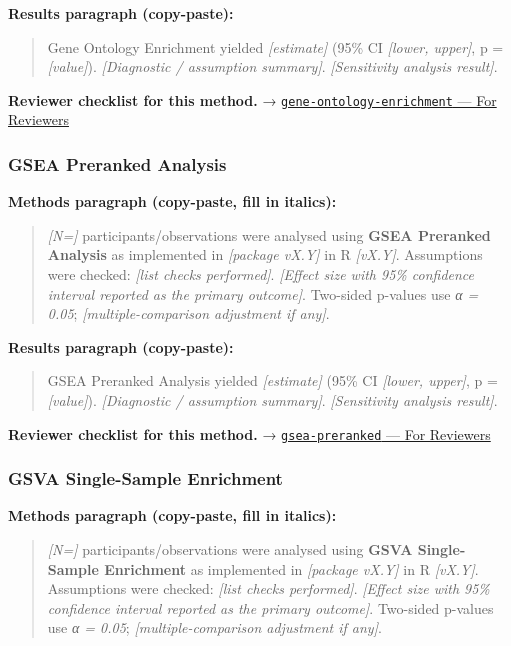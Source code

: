 \documentclass[
]{article}
\begin{document}
\textbf{Results paragraph (copy-paste):}

\begin{quote}
Gene Ontology Enrichment yielded \emph{{[}estimate{]}} (95\% CI
\emph{{[}lower, upper{]}}, p = \emph{{[}value{]}}). \emph{{[}Diagnostic
/ assumption summary{]}}. \emph{{[}Sensitivity analysis result{]}}.
\end{quote}

\textbf{Reviewer checklist for this method.} →
\href{../chapters/12-bioinformatics/gene-ontology-enrichment.Rmd\#for-reviewers}{\texttt{gene-ontology-enrichment}
--- For Reviewers}

\subsubsection{GSEA Preranked Analysis}\label{gsea-preranked-analysis}

\textbf{Methods paragraph (copy-paste, fill in italics):}

\begin{quote}
\emph{{[}N={]}} participants/observations were analysed using
\textbf{GSEA Preranked Analysis} as implemented in \emph{{[}package
vX.Y{]}} in R \emph{{[}vX.Y{]}}. Assumptions were checked: \emph{{[}list
checks performed{]}}. \emph{{[}Effect size with 95\% confidence interval
reported as the primary outcome{]}}. Two-sided p-values use \emph{α =
0.05}; \emph{{[}multiple-comparison adjustment if any{]}}.
\end{quote}

\textbf{Results paragraph (copy-paste):}

\begin{quote}
GSEA Preranked Analysis yielded \emph{{[}estimate{]}} (95\% CI
\emph{{[}lower, upper{]}}, p = \emph{{[}value{]}}). \emph{{[}Diagnostic
/ assumption summary{]}}. \emph{{[}Sensitivity analysis result{]}}.
\end{quote}

\textbf{Reviewer checklist for this method.} →
\href{../chapters/12-bioinformatics/gsea-preranked.Rmd\#for-reviewers}{\texttt{gsea-preranked}
--- For Reviewers}

\subsubsection{GSVA Single-Sample
Enrichment}\label{gsva-single-sample-enrichment}

\textbf{Methods paragraph (copy-paste, fill in italics):}

\begin{quote}
\emph{{[}N={]}} participants/observations were analysed using
\textbf{GSVA Single-Sample Enrichment} as implemented in
\emph{{[}package vX.Y{]}} in R \emph{{[}vX.Y{]}}. Assumptions were
checked: \emph{{[}list checks performed{]}}. \emph{{[}Effect size with
95\% confidence interval reported as the primary outcome{]}}. Two-sided
p-values use \emph{α = 0.05}; \emph{{[}multiple-comparison adjustment if
any{]}}.
\end{quote}
\end{document}
